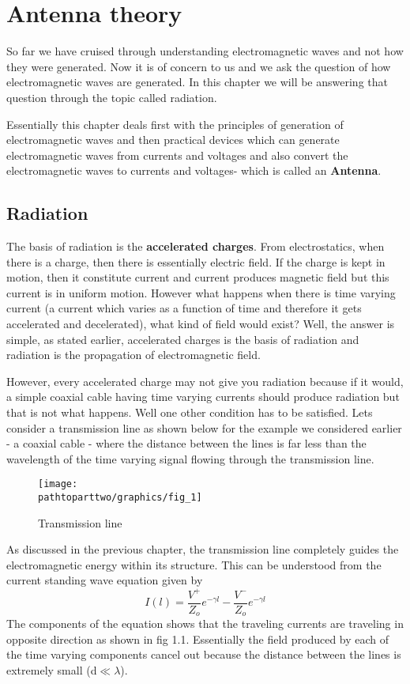 \chapter{Antenna theory}
So far we have cruised through understanding electromagnetic waves and not how they were generated. Now it is of concern to us and we ask the question of how electromagnetic waves are generated. In this chapter we will be answering that question through the topic called radiation. 

Essentially this chapter deals first with the principles of generation of electromagnetic waves and then practical devices which can generate electromagnetic waves from currents and voltages and also convert the electromagnetic waves to currents and voltages- which is called an \textbf{Antenna}.

\section{Radiation}
The basis of radiation is the \textbf{accelerated charges}. From electrostatics, when there is a charge, then there is essentially electric field. If the charge is kept in motion, then it constitute current and current produces magnetic field but this current is in uniform motion. However what happens when there is time varying current (a current which varies as a function of time and therefore it gets accelerated and decelerated), what kind of field would exist? Well, the answer is simple, as stated earlier, accelerated charges is the basis of radiation and radiation is the propagation of electromagnetic field.

However, every accelerated charge may not give you radiation because if it would, a simple coaxial cable having time varying currents should produce radiation but that is not what happens. Well one other condition has to be satisfied. Lets consider a transmission line as shown below for the example we considered earlier - a coaxial cable - where the distance between the lines is far less than the wavelength of the time varying signal flowing through the transmission line.
\begin{figure}[h]
\centering
\texttt{[image: \\pathtoparttwo/graphics/fig\_1]}
\caption{Transmission line}
\end{figure}

As discussed in the previous chapter, the transmission line completely guides the electromagnetic energy within its structure. This can be understood from the current standing wave equation given by
$$I(l)=\dfrac{V^+}{Z_o}e^{-\gamma l} - \dfrac{V^-}{Z_o}e^{-\gamma l}$$
The components of the equation shows that the traveling currents are traveling in opposite direction as shown in fig 1.1. Essentially the field produced by each of the time varying components cancel out because the distance between the lines is extremely small (d$\ll\lambda$). 

